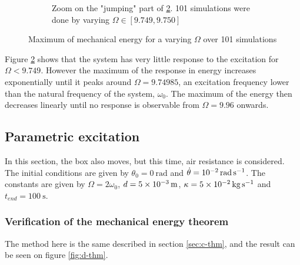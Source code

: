 \documentclass[a4paper,12pt,twoside]{article}
\begin{document}
\begin{figure}[h]
\begin{subfigure}[t]{0.49\textwidth}
		\caption{Zoom on the "jumping" part of \ref{fig:c-emax}. \num{101} simulations were done by varying $\Omega\in\left[9.749, 9.750 \right]$}
		\label{fig:c-emax-zoom}
	\end{subfigure}
	\caption{Maximum of mechanical energy for a varying $\Omega$ over 101 simulations}
	\label{fig:c-emax}
\end{figure}

Figure \ref{fig:c-emax} shows that the system has very little response to the excitation for $\Omega<9.749$. However the maximum of the response in energy increases exponentially until it peaks around $\Omega= 9.74985$, an excitation frequency lower than the natural frequency of the system, $\omega_0$. The maximum of the energy then decreases linearly until no response is observable from $\Omega=9.96$ onwards.


\subsection{Parametric excitation}

In this section, the box also moves, but this time, air resistance is considered.
The initial conditions are given by $\theta_0 = \SI{0}{\radian}$ and $\dot{\theta} = \SI{d-2}{\radian\per\second}$.
The constants are given by $\Omega = 2\omega_0$, $d = \SI{5d-3}{\m}$, $\kappa = \SI{5d-2}{\kg\per\s}$ and $t_{end} = \SI{100}{\s}$.

\subsubsection{Verification of the mechanical energy theorem}

The method here is the same described in section \ref{sec:c-thm}, and the result can be seen on figure \ref{fig:d-thm}.
\end{document}
